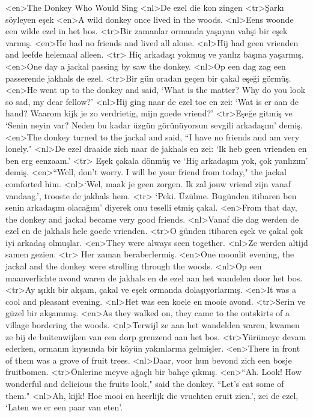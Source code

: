 <en>The Donkey Who Would Sing 
<nl>De ezel die kon zingen
<tr>Şarkı söyleyen eşek 
<en>A wild donkey once lived in the woods. 
<nl>Eens woonde een wilde ezel in het bos.
<tr>Bir zamanlar ormanda yaşayan vahşi bir eşek varmış.
<en>He had no friends and lived all alone. 
<nl>Hij had geen vrienden and leefde helemaal alleen.
<tr> Hiç arkadaşı yokmuş ve yanlız başına yaşarmış.
<en>One day a jackal passing by saw the donkey. 
<nl>Op een dag zag een passerende jakhals de ezel.
<tr>Bir gün oradan geçen bir çakal eşeği görmüş.
<en>He went up to the donkey and said, `What is the matter? Why do you look so sad, my dear fellow?' 
<nl>Hij ging naar de ezel toe en zei: `Wat is er aan de hand? Waarom kijk je zo verdrietig, mijn goede vriend?'
<tr>Eşeğe gitmiş ve `Senin neyin var? Neden bu kadar üzgün görünüyorsun sevgili arkadaşım' demiş.
<en>The donkey turned to the jackal and said, “I have no friends and am very lonely." 
<nl>De ezel draaide zich naar de jakhals en zei: `Ik heb geen vrienden en ben erg eenzaam.'
<tr> Eşek çakala dönmüş ve `Hiç arkadaşım yok, çok yanlızım' demiş.
<en>“Well, don't worry. I will be your friend from today," the jackal comforted him. 
<nl>`Wel, maak je geen zorgen. Ik zal jouw vriend zijn vanaf vandaag.', trooste de jakhals hem.
<tr> `Peki. Üzülme. Bugünden itibaren ben senin arkadaşım olacağım' diyerek onu teselli etmiş çakal.
<en>From that day, the donkey and jackal became very good friends. 
<nl>Vanaf die dag werden de ezel en de jakhals hele goede vrienden.
<tr>O günden itibaren eşek ve çakal çok iyi arkadaş olmuşlar.
<en>They were always seen together. 
<nl>Ze werden altijd samen gezien.
<tr> Her zaman beraberlermiş.
<en>One moonlit evening, the jackal and the donkey were strolling through the woods. 
<nl>Op een maanverlichte avond waren de jakhals en de ezel aan het wandelen door het bos.
<tr>Ay ışıklı bir akşam, çakal ve eşek ormanda dolaşıyorlarmış.
<en>It was a cool and pleasant evening. 
<nl>Het was een koele en mooie avond.
<tr>Serin ve güzel bir akşammış.
<en>As they walked on, they came to the outskirts of a village bordering the woods. 
<nl>Terwijl ze aan het wandelden waren, kwamen ze bij de buitenwijken van een dorp grenzend aan het bos.
<tr>Yürümeye devam ederken, ormanın kıyısında bir köyün yakınlarına gelmişler.
<en>There in front of them was a grove of fruit trees. 
<nl>Daar, voor hun bevond zich een bosje fruitbomen.
<tr>Önlerine meyve ağaçlı bir bahçe çıkmış.
<en>“Ah. Look! How wonderful and delicious the fruits look," said the donkey. “Let’s eat some of them." 
<nl>Ah, kijk! Hoe mooi en heerlijk die vruchten eruit zien.', zei de ezel, `Laten we er een paar van eten'.
